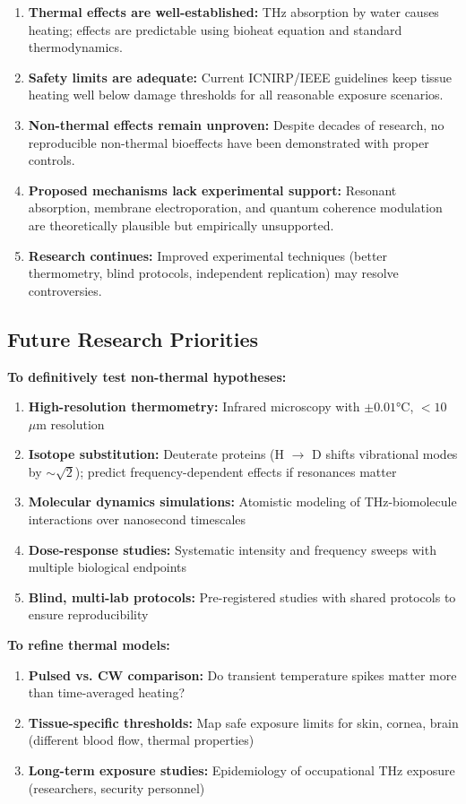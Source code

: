 \begin{enumerate}
\item \textbf{Thermal effects are well-established:} THz absorption by water causes heating; effects are predictable using bioheat equation and standard thermodynamics.
\item \textbf{Safety limits are adequate:} Current ICNIRP/IEEE guidelines keep tissue heating well below damage thresholds for all reasonable exposure scenarios.
\item \textbf{Non-thermal effects remain unproven:} Despite decades of research, no reproducible non-thermal bioeffects have been demonstrated with proper controls.
\item \textbf{Proposed mechanisms lack experimental support:} Resonant absorption, membrane electroporation, and quantum coherence modulation are theoretically plausible but empirically unsupported.
\item \textbf{Research continues:} Improved experimental techniques (better thermometry, blind protocols, independent replication) may resolve controversies.
\end{enumerate}

\subsection{Future Research Priorities}

\textbf{To definitively test non-thermal hypotheses:}
\begin{enumerate}
\item \textbf{High-resolution thermometry:} Infrared microscopy with $\pm 0.01°$C, $<10$~$\mu$m resolution
\item \textbf{Isotope substitution:} Deuterate proteins (H $\rightarrow$ D shifts vibrational modes by $\sim\sqrt{2}$); predict frequency-dependent effects if resonances matter
\item \textbf{Molecular dynamics simulations:} Atomistic modeling of THz-biomolecule interactions over nanosecond timescales
\item \textbf{Dose-response studies:} Systematic intensity and frequency sweeps with multiple biological endpoints
\item \textbf{Blind, multi-lab protocols:} Pre-registered studies with shared protocols to ensure reproducibility
\end{enumerate}

\textbf{To refine thermal models:}
\begin{enumerate}
\item \textbf{Pulsed vs. CW comparison:} Do transient temperature spikes matter more than time-averaged heating?
\item \textbf{Tissue-specific thresholds:} Map safe exposure limits for skin, cornea, brain (different blood flow, thermal properties)
\item \textbf{Long-term exposure studies:} Epidemiology of occupational THz exposure (researchers, security personnel)
\end{enumerate}

